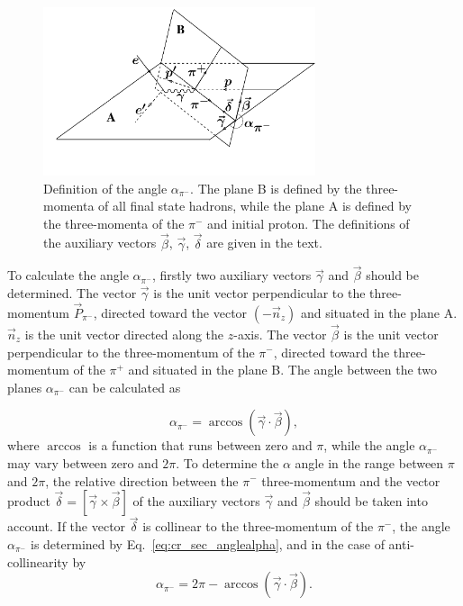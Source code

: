 \documentclass[prc,twocolumn,superscriptaddress,showpacs,amssymb,amsmath,amsfonts,aps,nofootinbib]{revtex4-1}
\begin{document}
\begin{figure}[htp]
\begin{center}
\includegraphics[width=8cm,trim=0mm 14mm 0mm 0mm,clip]{pictures/angles/alpha_pim_draw.pdf}
\caption{\small Definition of the angle $\alpha_{\pi^{-}}$. The plane B is defined by the three-momenta of all final state hadrons, while the plane A is defined by  the three-momenta of the $\pi^{-}$ and initial proton. The definitions of the auxiliary vectors $\vec \beta$, $\vec \gamma$, $\vec \delta$ are given in the text.} \label{fig:cr_sec_kinematic2}
\end{center}
\end{figure}


To calculate the angle $\alpha_{\pi^{-}}$, firstly two
auxiliary vectors $\vec \gamma$  and
$\vec \beta$ should be determined. The vector $\vec \gamma$ is the unit vector perpendicular to the three-momentum
$\vec P_{\pi^{-}}$, directed toward the vector $(-\vec n_{z})$ and situated in the plane A. $\vec
n_{z}$ is the unit vector directed along the $z$-axis.
The vector $\vec \beta$ is the unit vector perpendicular to the three-momentum of the $\pi^{-}$, 
directed toward the three-momentum of the $\pi^{+}$ and situated in the plane B. 
The angle between the two planes  $\alpha_{\pi^{-}}$ can be calculated as
 
\begin{equation}
\alpha_{\pi^{-}} = \arccos(\vec \gamma \cdot \vec \beta),
\label{eq:cr_sec_anglealpha}
\end{equation}
where $\arccos$ is a function that runs between zero and
$\pi$, while the angle $\alpha_{\pi^{-}}$ may vary between zero and
$2\pi$. To determine the $\alpha$ angle in the
range between $\pi$ and $2\pi$, 
the relative direction between the $\pi^{-}$ three-momentum and the vector product $\vec \delta = [ \vec \gamma \times \vec \beta ]$ of the auxiliary vectors $\vec
\gamma$ and $\vec \beta$ should be taken into account.
If the vector $\vec \delta$ is collinear to the three-momentum of the $\pi^{-}$, the angle $\alpha_{\pi^{-}}$ is determined
by Eq.~\eqref{eq:cr_sec_anglealpha}, and in the case of anti-collinearity by
\begin{equation}
\alpha_{\pi^{-}} = 2\pi - \arccos(\vec \gamma \cdot \vec \beta).
\label{eq:cr_sec_anglealpha_var}
\end{equation}
\end{document}
